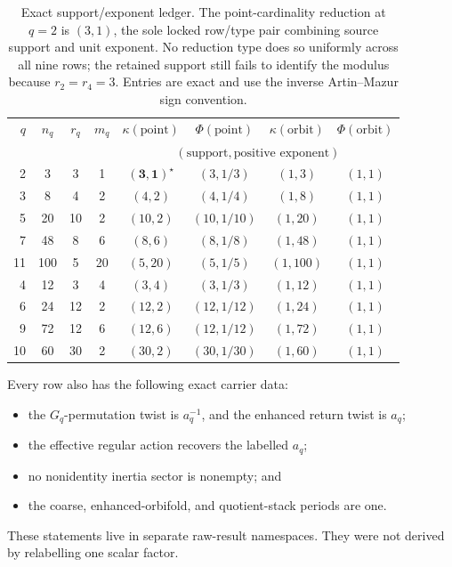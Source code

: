 \documentclass[11pt]{article}
\theoremstyle{definition}
\theoremstyle{remark}
\begin{document}
\begin{table}[htbp]
  \centering
  \caption{Exact support/exponent ledger.  The point-cardinality reduction
  at \(q=2\) is \((3,1)\), the sole locked row/type pair combining source
  support and unit exponent.  No reduction type does so uniformly across
  all nine rows; the retained support still fails to identify the modulus
  because \(r_2=r_4=3\).  Entries are exact and use the inverse
  Artin--Mazur sign convention.}
  \label{tab:nine-row-ledger}
  \small
  \setlength{\tabcolsep}{4pt}
  \begin{tabular}{@{}rccccccc@{}}
    \toprule
    \(q\) & \(n_q\) & \(r_q\) & \(m_q\)
      & \(\kappa(\mathrm{point})\)
      & \(\Phi(\mathrm{point})\)
      & \(\kappa(\mathrm{orbit})\)
      & \(\Phi(\mathrm{orbit})\) \\
    & & & & \multicolumn{4}{c}{\((\text{support},\text{positive exponent})\)}\\
    \midrule
     2 &   3 &  3 &  1 & \(\mathbf{(3,1)}^\star\) & \((3,1/3)\)   & \((1,3)\)   & \((1,1)\) \\
     3 &   8 &  4 &  2 & \((4,2)\)                & \((4,1/4)\)   & \((1,8)\)   & \((1,1)\) \\
     5 &  20 & 10 &  2 & \((10,2)\)               & \((10,1/10)\) & \((1,20)\)  & \((1,1)\) \\
     7 &  48 &  8 &  6 & \((8,6)\)                & \((8,1/8)\)   & \((1,48)\)  & \((1,1)\) \\
    11 & 100 &  5 & 20 & \((5,20)\)               & \((5,1/5)\)   & \((1,100)\) & \((1,1)\) \\
     4 &  12 &  3 &  4 & \((3,4)\)                & \((3,1/3)\)   & \((1,12)\)  & \((1,1)\) \\
     6 &  24 & 12 &  2 & \((12,2)\)               & \((12,1/12)\) & \((1,24)\)  & \((1,1)\) \\
     9 &  72 & 12 &  6 & \((12,6)\)               & \((12,1/12)\) & \((1,72)\)  & \((1,1)\) \\
    10 &  60 & 30 &  2 & \((30,2)\)               & \((30,1/30)\) & \((1,60)\)  & \((1,1)\) \\
    \bottomrule
  \end{tabular}
\end{table}

Every row also has the following exact carrier data:
\begin{itemize}
  \item the \(G_q\)-permutation twist is \(a_q^{-1}\), and the enhanced
        return twist is \(a_q\);
  \item the effective regular action recovers the labelled \(a_q\);
  \item no nonidentity inertia sector is nonempty; and
  \item the coarse, enhanced-orbifold, and quotient-stack periods are one.
\end{itemize}
These statements live in separate raw-result namespaces.  They were not
derived by relabelling one scalar factor.
\end{document}
